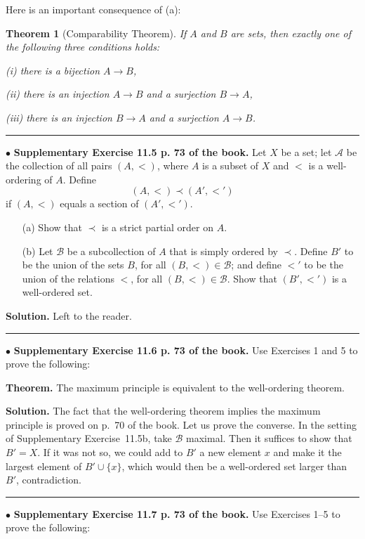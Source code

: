 \documentclass[12pt,letterpaper]{article}
\newtheorem{thm}{Theorem}%
\newcommand{\hs}{\bigskip\hrule\medskip}
\newcommand{\mc}{\mathcal}
\newcommand{\noi}{\noindent}%
\begin{document}
Here is an important consequence of (a): 

\begin{thm}[Comparability Theorem] 
If $A$ and $B$ are sets, then exactly one of the following three conditions holds: 

\emph{(i)} there is a bijection $A\to B$, 

\emph{(ii)} there is an injection $A\to B$ and a surjection $B\to A$, 

\emph{(iii)} there is an injection $B\to A$ and a surjection $A\to B$. 
\end{thm}

\hrule\medskip

\noi$\bullet$ \textbf{Supplementary Exercise 11.5 p. 73 of the book.} Let $X$ be a set; let $\mc A$ be the collection of all pairs $(A, <)$, where $A$ is a subset of $X$ and $<$ is a well-ordering of $A$. Define
\[(A, <) \prec (A',<')\]
if $(A, <)$ equals a section of $(A',<')$.
\begin{enumerate}
    \item[(a)] Show that $\prec$ is a strict partial order on $A$.
    \item[(b)] Let $\mc B$ be a subcollection of $A$ that is simply ordered by $\prec$. Define $B'$ to be the union of the sets $B$, for all $(B, <) \in\mc B$; and define $<'$ to be the union of the relations $<$, for all $(B, <) \in\mc B$. Show that $(B', <')$ is a well-ordered set.
\end{enumerate} 

\noi\textbf{Solution.} Left to the reader. 

\hs

\noi$\bullet$ \textbf{Supplementary Exercise 11.6 p. 73 of the book.} Use Exercises 1 and 5 to prove the following: 

\noi\textbf{Theorem.} The maximum principle is equivalent to the well-ordering theorem. 

\noi\textbf{Solution.} The fact that the well-ordering theorem implies the maximum principle is proved on p.~70 of the book. Let us prove the converse. In the setting of Supplementary Exercise~11.5b, take $\mc B$ maximal. Then it suffices to show that $B'=X$. If it was not so, we could add to $B'$ a new element $x$ and make it the largest element of $B'\cup\{x\}$, which would then be a well-ordered set larger than $B'$, contradiction. 

\hs 

\noi$\bullet$ \textbf{Supplementary Exercise 11.7 p. 73 of the book.} Use Exercises 1--5 to prove the following: 
\end{document}
